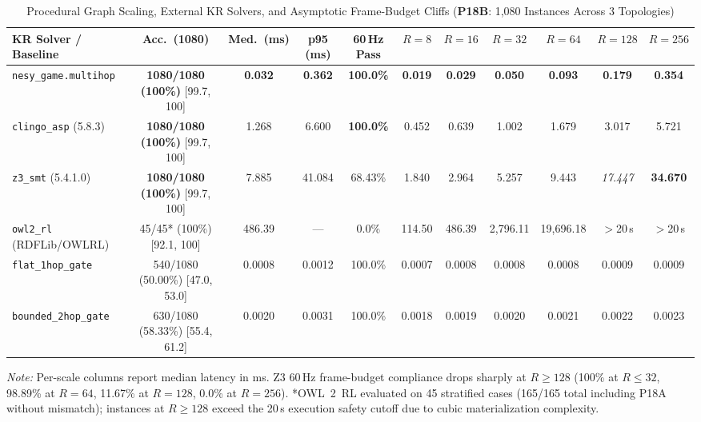 \begin{table}[!tbp]
\caption{Procedural Graph Scaling, External KR Solvers, and Asymptotic Frame-Budget Cliffs (\textbf{P18B}: 1,080 Instances Across 3 Topologies)}
\label{tab:p18b}
\centering
\scriptsize
\setlength{\tabcolsep}{2.5pt}
\begin{tabularx}{\textwidth}{@{}>{\raggedright\arraybackslash}Xcccccccccc@{}}
\toprule
\textbf{KR Solver / Baseline} & \textbf{Acc.\ (1080)} & \textbf{Med.\ (ms)} & \textbf{p95 (ms)} & \textbf{60\,Hz Pass} & \textbf{$R{=}8$} & \textbf{$R{=}16$} & \textbf{$R{=}32$} & \textbf{$R{=}64$} & \textbf{$R{=}128$} & \textbf{$R{=}256$} \\
\midrule
\texttt{nesy\_game.multihop} & \textbf{1080/1080 (100\%)} [99.7, 100] & \textbf{0.032} & \textbf{0.362} & \textbf{100.0\%} & \textbf{0.019} & \textbf{0.029} & \textbf{0.050} & \textbf{0.093} & \textbf{0.179} & \textbf{0.354} \\
\texttt{clingo\_asp} (5.8.3)~\cite{gebser2019clingo} & \textbf{1080/1080 (100\%)} [99.7, 100] & 1.268 & 6.600 & \textbf{100.0\%} & 0.452 & 0.639 & 1.002 & 1.679 & 3.017 & 5.721 \\
\texttt{z3\_smt} (5.4.1.0)~\cite{demoura2008z3} & \textbf{1080/1080 (100\%)} [99.7, 100] & 7.885 & 41.084 & 68.43\% & 1.840 & 2.964 & 5.257 & 9.443 & \textit{17.447} & \textbf{34.670} \\
\texttt{owl2\_rl} (RDFLib/OWLRL)~\cite{motik2012owl2profiles} & 45/45* (100\%) [92.1, 100] & 486.39 & --- & 0.0\% & 114.50 & 486.39 & 2,796.11 & 19,696.18 & $>$20\,s & $>$20\,s \\
\texttt{flat\_1hop\_gate} & 540/1080 (50.00\%) [47.0, 53.0] & 0.0008 & 0.0012 & 100.0\% & 0.0007 & 0.0008 & 0.0008 & 0.0008 & 0.0009 & 0.0009 \\
\texttt{bounded\_2hop\_gate} & 630/1080 (58.33\%) [55.4, 61.2] & 0.0020 & 0.0031 & 100.0\% & 0.0018 & 0.0019 & 0.0020 & 0.0021 & 0.0022 & 0.0023 \\
\bottomrule
\end{tabularx}
\vspace{1ex}
\raggedright\scriptsize\textit{Note:} Per-scale columns report median latency in ms. Z3 60\,Hz frame-budget compliance drops sharply at $R{\ge}128$ (100\% at $R{\le}32$, 98.89\% at $R{=}64$, 11.67\% at $R{=}128$, 0.0\% at $R{=}256$). *OWL~2~RL evaluated on 45 stratified cases (165/165 total including P18A without mismatch); instances at $R{\ge}128$ exceed the 20\,s execution safety cutoff due to cubic materialization complexity.
\end{table}

